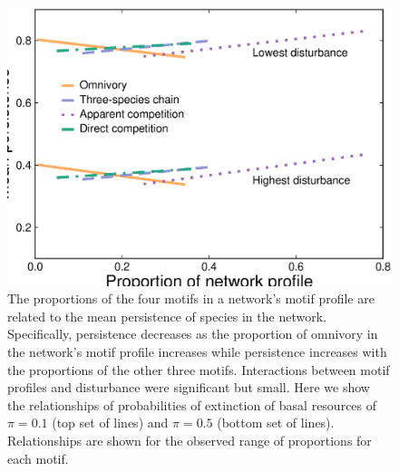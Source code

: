\documentclass[12pt]{article}
\begin{document}
\begin{spacing}{2.0}
    \begin{figure}[hb!]
        \centering
        \includegraphics[width=\textwidth]{figures/persistence_motif_profiles.eps}
        \caption{The proportions of the four motifs in a network's motif profile are related to the mean persistence of species in the network. Specifically, persistence decreases as the proportion of omnivory in the network's motif profile increases while persistence increases with the proportions of the other three motifs. Interactions between motif profiles and disturbance were significant but small. Here we show the relationships of probabilities of extinction of basal resources of $\pi=0.1$ (top set of lines) and $\pi=0.5$ (bottom set of lines). Relationships are shown for the observed range of proportions for each motif.}      
        \label{fig:motif_profile_persistence}
    \end{figure}    


\end{spacing}
\end{document}
